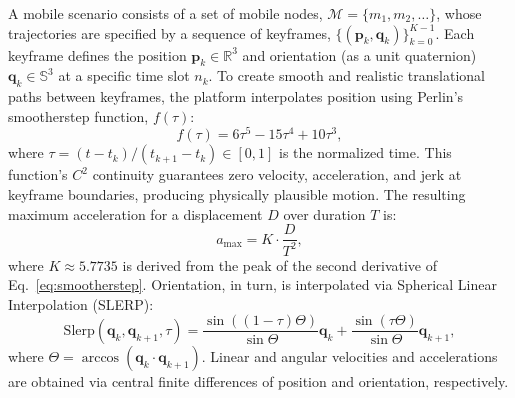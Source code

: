 \documentclass[fleqn,10pt]{wlscirep}
\begin{document}
A mobile scenario consists of a set of mobile nodes, $\mathcal{M} = \{m_1, m_2, \dots\}$, whose trajectories are specified by a sequence of keyframes, $\{(\mathbf{p}_k, \mathbf{q}_k)\}_{k=0}^{K-1}$. Each keyframe defines the position $\mathbf{p}_k \in \mathbb{R}^3$ and orientation (as a unit quaternion) $\mathbf{q}_k \in \mathbb{S}^3$ at a specific time slot $n_k$. To create smooth and realistic translational paths between keyframes, the platform interpolates position using Perlin's smootherstep function, $f(\tau)$:
\begin{equation}
f(\tau) = 6\tau^5 - 15\tau^4 + 10\tau^3,
\label{eq:smootherstep}
\end{equation}
where $\tau = (t - t_k) / (t_{k+1} - t_k) \in [0, 1]$ is the normalized time. This function's $C^2$ continuity guarantees zero velocity, acceleration, and jerk at keyframe boundaries, producing physically plausible motion. The resulting maximum acceleration for a displacement $D$ over duration $T$ is:
\begin{equation}
    a_{\max} = K \cdot \frac{D}{T^2},
\end{equation}
where $K \approx 5.7735$ is derived from the peak of the second derivative of Eq.~\eqref{eq:smootherstep}. Orientation, in turn, is interpolated via Spherical Linear Interpolation (SLERP):
\begin{equation}
    \text{Slerp}(\mathbf{q}_k, \mathbf{q}_{k+1}, \tau) = \frac{\sin((1-\tau)\Theta)}{\sin\Theta}\mathbf{q}_k + \frac{\sin(\tau\Theta)}{\sin\Theta}\mathbf{q}_{k+1},
\end{equation}
where $\Theta = \arccos(\mathbf{q}_k \cdot \mathbf{q}_{k+1})$. Linear and angular velocities and accelerations are obtained via central finite differences of position and orientation, respectively.
\end{document}
